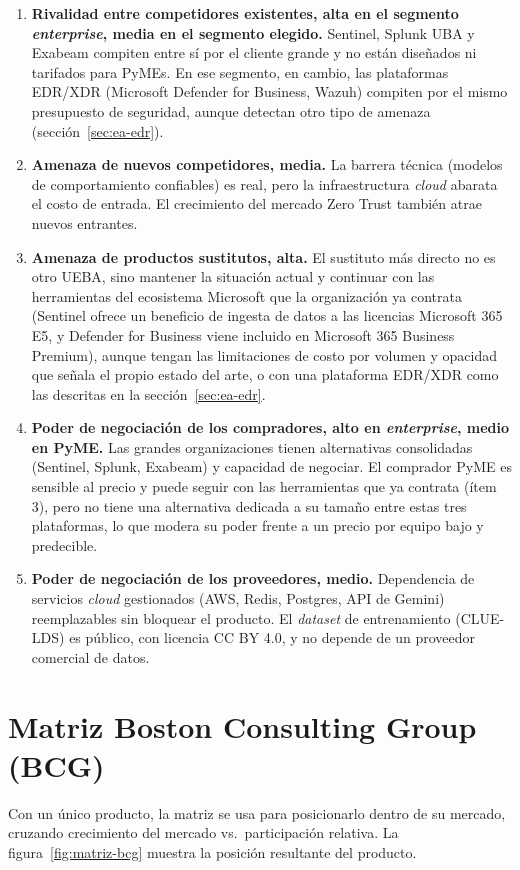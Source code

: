 \begin{enumerate}
	\item \textbf{Rivalidad entre competidores existentes, alta en el segmento \emph{enterprise}, media en el segmento elegido.} Sentinel, Splunk UBA y Exabeam compiten entre sí por el cliente grande y no están diseñados ni tarifados para PyMEs. En ese segmento, en cambio, las plataformas EDR/XDR (Microsoft Defender for Business, Wazuh) compiten por el mismo presupuesto de seguridad, aunque detectan otro tipo de amenaza (sección~\ref{sec:ea-edr}).
	\item \textbf{Amenaza de nuevos competidores, media.} La barrera técnica (modelos de comportamiento confiables) es real, pero la infraestructura \emph{cloud} abarata el costo de entrada. El crecimiento del mercado Zero Trust también atrae nuevos entrantes.
	\item \textbf{Amenaza de productos sustitutos, alta.} El sustituto más directo no es otro UEBA, sino mantener la situación actual y continuar con las herramientas del ecosistema Microsoft que la organización ya contrata (Sentinel ofrece un beneficio de ingesta de datos a las licencias Microsoft 365 E5, y Defender for Business viene incluido en Microsoft 365 Business Premium), aunque tengan las limitaciones de costo por volumen y opacidad que señala el propio estado del arte, o con una plataforma EDR/XDR como las descritas en la sección~\ref{sec:ea-edr}.
	\item \textbf{Poder de negociación de los compradores, alto en \emph{enterprise}, medio en PyME.} Las grandes organizaciones tienen alternativas consolidadas (Sentinel, Splunk, Exabeam) y capacidad de negociar. El comprador PyME es sensible al precio y puede seguir con las herramientas que ya contrata (ítem 3), pero no tiene una alternativa dedicada a su tamaño entre estas tres plataformas, lo que modera su poder frente a un precio por equipo bajo y predecible.
	\item \textbf{Poder de negociación de los proveedores, medio.} Dependencia de servicios \emph{cloud} gestionados (AWS, Redis, Postgres, API de Gemini) reemplazables sin bloquear el producto. El \emph{dataset} de entrenamiento (CLUE-LDS) es público, con licencia CC BY 4.0, y no depende de un proveedor comercial de datos.
\end{enumerate}

\section{Matriz Boston Consulting Group (BCG)}
Con un único producto, la matriz \parencite{Henderson1970} se usa para posicionarlo dentro de su mercado, cruzando crecimiento del mercado vs.\ participación relativa. La figura~\ref{fig:matriz-bcg} muestra la posición resultante del producto.

